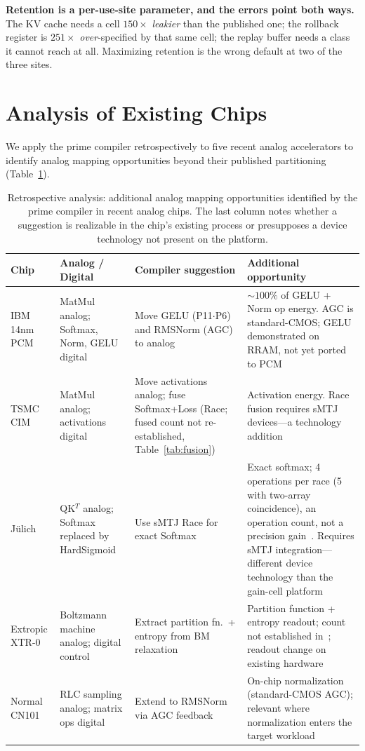 \documentclass[11pt]{article}
\begin{document}
\textbf{Retention is a per-use-site parameter, and the errors point both ways.} The KV cache needs a cell $150\times$ \textit{leakier} than the published one; the rollback register is $251\times$ \textit{over}-specified by that same cell; the replay buffer needs a class it cannot reach at all. Maximizing retention is the wrong default at two of the three sites.

\section{Analysis of Existing Chips}
\label{sec:analysis}

We apply the prime compiler retrospectively to five recent analog accelerators to identify analog mapping opportunities beyond their published partitioning (Table~\ref{tab:chips}).

\begin{table}[t]
\centering
\caption{Retrospective analysis: additional analog mapping opportunities identified by the prime compiler in recent analog chips. The last column notes whether a suggestion is realizable in the chip's existing process or presupposes a device technology not present on the platform.}
\label{tab:chips}
\footnotesize
\begin{tabular}{p{2.8cm}p{2.5cm}p{2.5cm}p{4.5cm}}
\toprule
Chip & Analog / Digital & Compiler suggestion & Additional opportunity \\
\midrule
IBM 14nm PCM~\cite{ibm2025} & MatMul analog; Softmax, Norm, GELU digital & Move GELU (P11$\cdot$P6) and RMSNorm (AGC) to analog & ${\sim}100\%$ of GELU + Norm op energy. AGC is standard-CMOS; GELU demonstrated on RRAM, not yet ported to PCM \\
\midrule
TSMC CIM~\cite{tsmc2025} & MatMul analog; activations digital & Move activations analog; fuse Softmax+Loss (Race; fused count not re-established, Table~\ref{tab:fusion}) & Activation energy. Race fusion requires sMTJ devices---a technology addition \\
\midrule
J\"ulich~\cite{leroux2025a} & QK$^T$ analog; Softmax replaced by HardSigmoid & Use sMTJ Race for exact Softmax & Exact softmax; 4 operations per race (5 with two-array coincidence), an operation count, not a precision gain~\cite{bieg2026}. Requires sMTJ integration---different device technology than the gain-cell platform \\
\midrule
Extropic XTR-0~\cite{extropic2025} & Boltzmann machine analog; digital control & Extract partition fn.\ + entropy from BM relaxation & Partition function + entropy readout; count not established in~\cite{bieg2026}; readout change on existing hardware \\
\midrule
Normal CN101~\cite{normal2025} & RLC sampling analog; matrix ops digital & Extend to RMSNorm via AGC feedback & On-chip normalization (standard-CMOS AGC); relevant where normalization enters the target workload \\
\bottomrule
\end{tabular}
\end{table}
\end{document}
